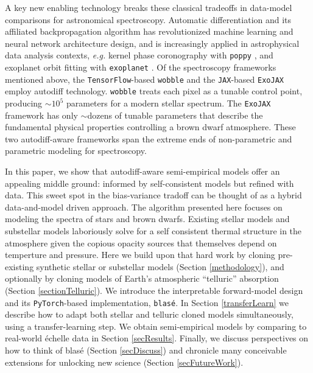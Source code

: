 \documentclass[twocolumn]{aastex631}
\begin{document}
A key new enabling technology breaks these classical tradeoffs in data-model comparisons for astronomical spectroscopy.  Automatic differentiation \citep[``autodiff'' or ``autograd'',][]{2015arXiv150205767G, 2016PhDT.......317M} and its affiliated backpropagation algorithm \citep{kelley1960,Linnainmaa1976TaylorEO, 1986Natur.323..533R, 1990JGCD...13..926D} has revolutionized machine learning and neural network architecture design, and is increasingly applied in astrophysical data analysis contexts, \emph{e.g.} kernel phase coronography with \texttt{poppy} \citep{2021ApJ...907...40P}, and exoplanet orbit fitting with \texttt{exoplanet} \citep{2021JOSS....6.3285F}.  Of the spectroscopy frameworks mentioned above, the \texttt{TensorFlow}-based \citep{tensorflow2015-whitepaper} \texttt{wobble} and the \texttt{JAX}-based \citep{jax2018github} \texttt{ExoJAX} employ autodiff technology.  \texttt{wobble} treats each pixel as a tunable control point, producing $\sim10^5$ parameters for a modern stellar spectrum.  The \texttt{ExoJAX} framework has only $\sim$dozens of tunable parameters that describe the fundamental physical properties controlling a brown dwarf atmosphere.  These two autodiff-aware frameworks span the extreme ends of non-parametric and parametric modeling for spectroscopy.

In this paper, we show that autodiff-aware semi-empirical models offer an appealing middle ground: informed by self-consistent models but refined with data.  This sweet spot in the bias-variance tradoff can be thought of as a hybrid data-and-model driven approach.  The algorithm presented here focuses on modeling the spectra of stars and brown dwarfs.  Existing stellar models \citep[\emph{e.g.}][]{husser13} and substellar models \citep[\emph{e.g.}][]{2021ApJ...920...85M} laboriously solve for a self consistent thermal structure in the atmosphere given the copious opacity sources that themselves depend on temperture and pressure.  Here we build upon that hard work by cloning pre-existing synthetic stellar or substellar models (Section \ref{methodology}), and optionally by cloning models of Earth's atmospheric ``telluric'' absorption (Section \ref{sectionTelluric}). We introduce the interpretable forward-model design and its \texttt{PyTorch}-based \citep{2019arXiv191201703P} implementation, \texttt{blas\'e}.  In Section \ref{transferLearn}  we describe how to adapt both stellar and telluric cloned models simultaneously, using a transfer-learning step.  We obtain semi-empirical models by comparing to real-world \'echelle data in Section \ref{secResults}. Finally, we discuss perspectives on how to think of blas\'e (Section \ref{secDiscuss}) and chronicle many conceivable extensions for unlocking new science (Section \ref{secFutureWork}).
\end{document}
